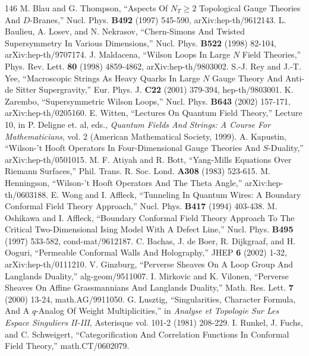 \begin{thebibliography}{146}
 M. Blau and G. Thompson, ``Aspects Of $N_T\geq 2$ Topological Gauge Theories And $D$-Branes,'' Nucl. Phys. \textbf{B492} (1997) 545-590, arXiv:hep-th/9612143.
 L. Baulieu, A. Losev, and N. Nekrasov, ``Chern-Simons And Twisted Supersymmetry In Various Dimensions,'' Nucl. Phys. \textbf{B522} (1998) 82-104, arXiv:hep-th/9707174.
 J. Maldacena, ``Wilson Loops In Large $N$ Field Theories,'' Phys. Rev. Lett. \textbf{80} (1998) 4859-4862, arXiv:hep-th/9803002.
 S.-J. Rey and J.-T. Yee, ``Macroscopic Strings As Heavy Quarks In Large $N$ Gauge Theory And Anti-de Sitter Supergravity,'' Eur. Phys. J. \textbf{C22} (2001) 379-394, hep-th/9803001.
 K. Zarembo, ``Supersymmetric Wilson Loops,'' Nucl. Phys. \textbf{B643} (2002) 157-171, arXiv:hep-th/0205160.
 E. Witten, ``Lectures On Quantum Field Theory,'' Lecture 10, in P. Deligne et. al, eds., \emph{Quantum Fields And Strings: A Course For Mathematicians}, vol. 2 (American Mathematical Society, 1999).
 A. Kapustin, ``Wilson-'t Hooft Operators In Four-Dimensional Gauge Theories And $S$-Duality,'' arXiv:hep-th/0501015.
 M. F. Atiyah and R. Bott, ``Yang-Mills Equations Over Riemann Surfaces,'' Phil. Trans. R. Soc. Lond. \textbf{A308} (1983) 523-615.
 M. Henningson, ``Wilson-'t Hooft Operators And The Theta Angle,'' arXiv:hep-th/0603188.
 E. Wong and I. Affleck, ``Tunneling In Quantum Wires: A Boundary Conformal Field Theory Approach,'' Nucl. Phys. \textbf{B417} (1994) 403-438.
 M. Oshikawa and I. Affleck, ``Boundary Conformal Field Theory Approach To The Critical Two-Dimensional Ising Model With A Defect Line,'' Nucl. Phys. \textbf{B495} (1997) 533-582, cond-mat/9612187.
 C. Bachas, J. de Boer, R. Dijkgraaf, and H. Ooguri, ``Permeable Conformal Walls And Holography,'' JHEP \textbf{6} (2002) 1-32, arXiv:hep-th/0111210.
 V. Ginzburg, ``Perverse Sheaves On A Loop Group And Langlands Duality,'' alg-geom/9511007.
 I. Mirkovic and K. Vilonen, ``Perverse Sheaves On Affine Grassmannians And Langlands Duality,'' Math. Res. Lett. \textbf{7} (2000) 13-24, math.AG/9911050.
 G. Lusztig, ``Singularities, Character Formula, And A $q$-Analog Of Weight Multiplicities,'' in \emph{Analyse et Topologie Sur Les Espace Singuliers II-III}, Asterisque vol. 101-2 (1981) 208-229.
 I. Runkel, J. Fuchs, and C. Schweigert, ``Categorification And Correlation Functions In Conformal Field Theory,'' math.CT/0602079.

\end{thebibliography}
